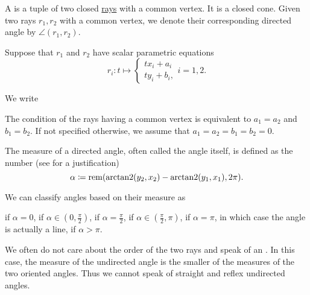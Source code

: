 \begin{definition}\label{def:angle}
  A  is a tuple of two closed \hyperref[def:geometric_ray]{rays} with a common vertex. It is a closed cone. Given two rays \( r_1, r_2 \) with a common vertex, we denote their corresponding directed angle by \( \angle(r_1, r_2) \).

  Suppose that \( r_1 \) and \( r_2 \) have scalar parametric equations
  \begin{equation*}
    r_i: t \mapsto
    \begin{cases}
      tx_i + a_i \\
      ty_i + b_i,
    \end{cases}
    i = 1, 2.
  \end{equation*}

  We write

  The condition of the rays having a common vertex is equivalent to \( a_1 = a_2 \) and \( b_1 = b_2 \). If not specified otherwise, we assume that \( a_1 = a_2 = b_1 = b_2 = 0 \).

  The measure of a directed angle, often called the angle itself, is defined as the number (see  for a justification)
  \begin{equation*}
    \alpha \coloneqq \operatorname{rem}(\operatorname{arctan2}(y_2, x_2) - \operatorname{arctan2}(y_1, x_1), 2\pi).
  \end{equation*}

  We can classify angles based on their measure as
  \begin{defenum}
      if \( \alpha = 0 \),
      if \( \alpha \in (0, \tfrac \pi 2) \),
      if \( \alpha = \tfrac \pi 2 \),
      if \( \alpha \in (\tfrac \pi 2, \pi) \),
      if \( \alpha = \pi \), in which case the angle is actually a line,
      if \( \alpha > \pi \).
  \end{defenum}

  We often do not care about the order of the two rays and speak of an . In this case, the measure of the undirected angle is the smaller of the measures of the two oriented angles. Thus we cannot speak of straight and reflex undirected angles.
\end{definition}

